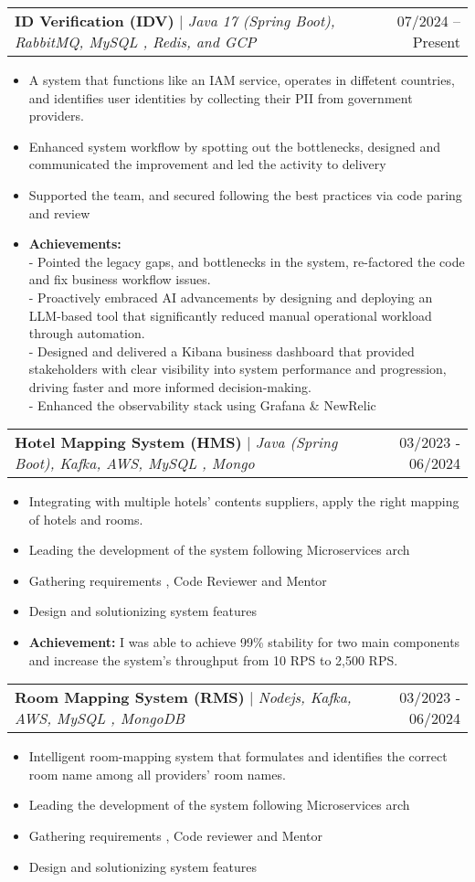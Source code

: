 \documentclass[letterpaper,11pt]{article}
\makeatletter
\newcommand{\resumeItem}[1]{
  \item\small{
    {#1 \vspace{-2pt}}
  }
}
\newcommand{\resumeProjectHeading}[2]{
    \item
    \begin{tabular*}{0.97\textwidth}{l@{\extracolsep{\fill}}r}
      \small#1 & #2 \\
    \end{tabular*}\vspace{-7pt}
}
\newcommand{\resumeItemListStart}{\begin{itemize}}
\newcommand{\resumeItemListEnd}{\end{itemize}\vspace{-5pt}}
\makeatother
\begin{document}
        \resumeProjectHeading
        {\textbf{ID Verification (IDV)} $|$ \footnotesize\emph{Java 17 (Spring Boot), RabbitMQ, MySQL , Redis, and GCP}}{07/2024 -- Present}
        \resumeItemListStart
            \resumeItem{A system that functions like an IAM service, operates in diffetent countries, and identifies user identities by collecting their PII from government providers.}
            \resumeItem{Enhanced system workflow by spotting out the bottlenecks, designed and communicated the improvement and led the activity to delivery}
            \resumeItem{Supported the team, and secured following the best practices via code paring and review}
            \resumeItem{
            	\textbf{Achievements:}\\
            	- Pointed the legacy gaps, and bottlenecks in the system, re-factored the code and fix business workflow issues. \\
            	- Proactively embraced AI advancements by designing and deploying an LLM-based tool that significantly reduced manual operational workload through automation. \\
            	- Designed and delivered a Kibana business dashboard that provided stakeholders with clear visibility into system performance and progression, driving faster and more informed decision-making. \\
            	- Enhanced the observability stack using Grafana \& NewRelic
           } 
          \resumeItemListEnd
    
		\vspace{3mm}    
    
        \resumeProjectHeading
        {\textbf{Hotel Mapping System (HMS)} $|$ \footnotesize\emph{Java (Spring Boot), Kafka, AWS, MySQL , Mongo}}{03/2023 - 06/2024}
        \resumeItemListStart
            \resumeItem{Integrating with multiple hotels' contents suppliers, apply the right mapping of hotels and rooms.}
            \resumeItem{Leading the development of the system following Microservices arch}
            \resumeItem{Gathering requirements , Code Reviewer and Mentor }
            \resumeItem{Design and solutionizing system features}
            \resumeItem{\textbf{Achievement:} I was able to achieve 99\% stability for two main components and increase the system's throughput from 10 RPS to 2,500 RPS. }
          \resumeItemListEnd
          
         \vspace{3mm} 
         
        \resumeProjectHeading
        {\textbf{Room Mapping System (RMS)} $|$ \footnotesize\emph{Nodejs, Kafka, AWS, MySQL , MongoDB}}{03/2023 - 06/2024}
        \resumeItemListStart
            \resumeItem{Intelligent room-mapping system that formulates and identifies the correct room name among all providers' room names.}
            \resumeItem{Leading the development of the system following Microservices arch}
            \resumeItem{Gathering requirements , Code reviewer and Mentor }
            \resumeItem{Design and solutionizing system features}
          \resumeItemListEnd
   		
\end{document}
